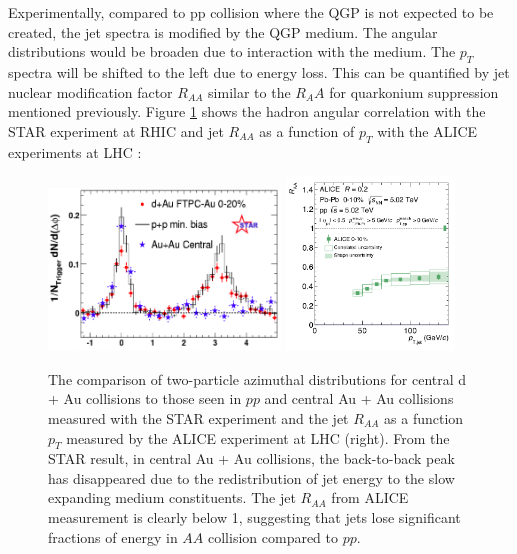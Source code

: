 Experimentally, compared to pp collision where the QGP is not expected to be created, the jet spectra is modified by the QGP medium. The angular distributions would be broaden due to interaction with the medium. The $p_T$ spectra will be shifted to the left due to energy loss. This can be quantified by jet nuclear modification factor $R_{AA}$ similar to the $R_AA$ for quarkonium suppression mentioned previously. Figure \ref{JetRAA} shows the hadron angular correlation with the STAR experiment at RHIC and jet $R_{AA}$ as a function of $p_T$ with the ALICE experiments at LHC \cite{STARJetRef,ALICEJetRef}:
  
\begin{figure}[hbtp]
\begin{center}
\includegraphics[width=0.55\textwidth]{Figures/Chapter1/HadronAngularSTAR.png}
\includegraphics[width=0.40\textwidth]{Figures/Chapter1/JetRAAALICE.png}
\caption{The comparison of two-particle azimuthal distributions for central d + Au collisions to those seen in $pp$ and central Au + Au collisions measured with the STAR experiment and the jet $R_{AA}$ as a function $p_T$ measured by the ALICE experiment at LHC (right). From the STAR result, in central Au + Au collisions, the back-to-back peak has disappeared due to the redistribution of jet energy to the slow expanding medium constituents. The jet $R_{AA}$ from ALICE measurement is clearly below 1, suggesting that jets lose significant fractions of energy in $AA$ collision compared to $pp$.}
\label{JetRAA}
\end{center}
\end{figure} 

